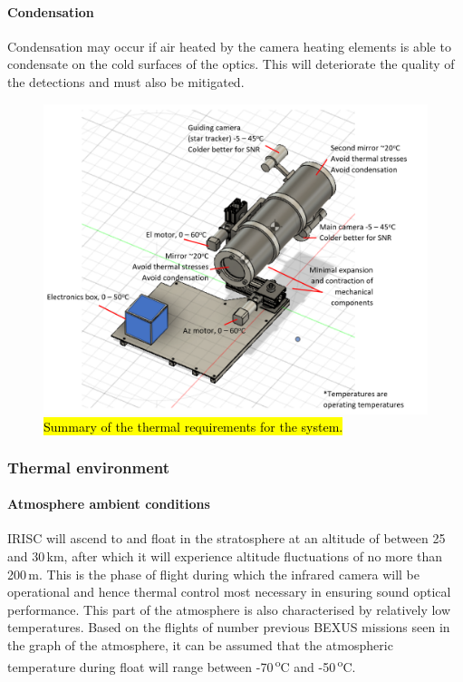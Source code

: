 \paragraph{Condensation}
Condensation may occur if air heated by the camera heating elements is able to condensate on the cold surfaces of the optics. This will deteriorate the quality of the detections and must also be mitigated.  \

	\begin{figure}[H]
    \centering
    \includegraphics[scale=0.8]{4-experiment-design/img/mechanical/thermalrequirements.PNG}
    	\caption{\hl{Summary of the thermal requirements for the system.}}
	\label{fig:thermalrequirements}
	\end{figure}


















\subsubsection{Thermal environment}
\paragraph{Atmosphere ambient conditions}
IRISC will ascend to and float in the stratosphere at an altitude of between 25 and 30\,km, after which it will experience altitude fluctuations of no more than 200\,m. This is the phase of flight during which the infrared camera will be operational and hence thermal control most necessary in ensuring sound optical performance. This part of the atmosphere is also characterised by relatively low temperatures. Based on the flights of number previous BEXUS missions seen in the graph of the atmosphere, it can be assumed that the atmospheric temperature during float will range between -70\,\textsuperscript{o}C and -50\,\textsuperscript{o}C. \\

